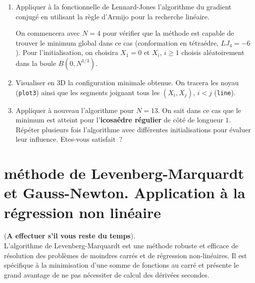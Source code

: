 \documentclass[11pt, a4paper]{amsart}
\begin{document}
%
\begin{enumerate}
%
\item  Appliquer à la fonctionnelle de Lennard-Jones l'algorithme du gradient conjugé en utilisant la règle d'Armijo pour la recherche linéaire. 

On commencera avec $N=4$ pour
vérifier que la méthode est capable de trouver le minimum global dans ce cas (conformation en tétraédre, $LJ_4=-6$). Pour l'initialisation, on choisira $X_1=0$ et $X_i$, $i\geq 1$ choisis aléatoirement dans la boule $B(0,N^{1/3})$.
%
\item Visualiser en 3D la configuration minimale obtenue. On tracera les noyau (\texttt{plot3}) ainsi que les segments joignant tous les $(X_i,X_j)$, $i<j$  (\texttt{line}).
%
\item Appliquer à nouveau l'algorithme pour $N=13$. On sait dans ce cas que le minimum est atteint pour l'\textbf{icosaédre régulier} de côté de longueur $1$. Répéter plusieurs fois l'algorithme avec différentes initialisations pour évaluer leur influence. Etes-vous satisfait~?
%
\end{enumerate}
%
\section{méthode de Levenberg-Marquardt et Gauss-Newton. Application à la régression non linéaire}
%
(\textbf{A effectuer s'il vous reste du temps}). \\

L'algorithme de Levenberg-Marquardt est une méthode robuste et efficace de résolution des problèmes de moindres carrés et de régression non-linéaires. Il est spécifique à la minimisation d'une somme de fonctions au carré et présente le grand avantage de ne pas nécessiter de calcul des dérivées secondes.
\end{document}

